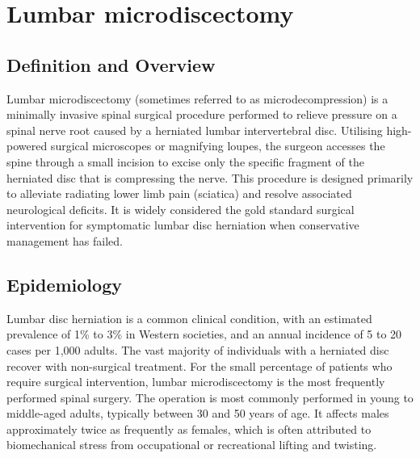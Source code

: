\chapter{Lumbar microdiscectomy}

\section*{Definition and Overview}
Lumbar microdiscectomy (sometimes referred to as microdecompression) is a minimally invasive spinal surgical procedure performed to relieve pressure on a spinal nerve root caused by a herniated lumbar intervertebral disc. Utilising high-powered surgical microscopes or magnifying loupes, the surgeon accesses the spine through a small incision to excise only the specific fragment of the herniated disc that is compressing the nerve. This procedure is designed primarily to alleviate radiating lower limb pain (sciatica) and resolve associated neurological deficits. It is widely considered the gold standard surgical intervention for symptomatic lumbar disc herniation when conservative management has failed.

\section*{Epidemiology}
Lumbar disc herniation is a common clinical condition, with an estimated prevalence of 1\% to 3\% in Western societies, and an annual incidence of 5 to 20 cases per 1,000 adults. The vast majority of individuals with a herniated disc recover with non-surgical treatment. For the small percentage of patients who require surgical intervention, lumbar microdiscectomy is the most frequently performed spinal surgery. The operation is most commonly performed in young to middle-aged adults, typically between 30 and 50 years of age. It affects males approximately twice as frequently as females, which is often attributed to biomechanical stress from occupational or recreational lifting and twisting.

